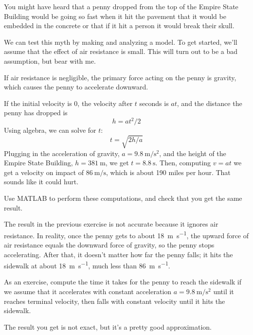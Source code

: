 \documentclass[../../book.tex]{subfiles}
\begin{document}
\begin{ex}
\label{penny}
You might have heard that a penny dropped from the top of the Empire State Building would be going so fast when it hit the pavement that it would be embedded in the concrete or that if it hit a person it would break their skull.


We can test this myth by making and analyzing a model.  To get started, we'll assume that the effect of air resistance is small.  This will turn out to be a bad assumption, but bear with me.

If air resistance is negligible, the primary force acting on the penny is gravity, which causes the penny to accelerate downward.


If the initial velocity is 0, the velocity after $t$ seconds is $a t$, and the distance the penny has dropped is
%
\[ h = a t^2 / 2 \]
%
Using algebra, we can solve for $t$:
%
\[ t = \sqrt{ 2 h / a} \]
%
Plugging in the acceleration of gravity,
$a = \SI{9.8}{\meter\per\second\squared}$, and the height of the Empire State Building,
$h = \SI{381}{\meter}$, we get
$t = \SI{8.8}{\second}$.
Then, computing $v = a t$ we get a velocity on impact of $\SI{86}{\meter\per\second}$, which is about 190 miles per hour.  That sounds like it could hurt.

Use MATLAB to perform these computations, and check that you get the same result.
\end{ex}

\begin{ex}
The result in the previous exercise is not accurate because it ignores air resistance.  In reality, once the penny gets to about \SI{18}{\meter\per\second}, the upward force of air resistance equals the downward force of gravity, so the penny stops accelerating.  After that, it doesn't matter how far the penny falls; it hits the sidewalk at about \SI{18}{\meter\per\second}, much less than \SI{86}{\meter\per\second}.

As an exercise, compute the time it takes for the penny to reach the sidewalk if we assume that it accelerates with constant acceleration
$a = \SI{9.8}{\meter\per\second\squared}$ until it reaches terminal velocity, then falls with constant velocity until it hits the sidewalk.

The result you get is not exact, but it's a pretty good approximation.
\end{ex}
\end{document}
